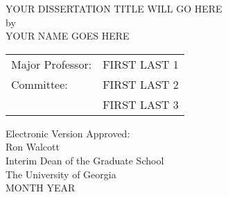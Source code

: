 \documentclass[12pt, notitlepage, twoside]{report}
\begin{document}
\newcommand{\doctitle}{Your Dissertation Title Will Go Here}
\newcommand{\docauthor}{Your Name Goes Here}



%



\newcommand{\degreesearned}{%
B.S., University of Georgia, 2018\\
  Enter only degrees already completed. Follow example above\\
  If degree was obtained outside of the US, the country \\
  of the school and date obtained will need to be provided.
}%

\newcommand{\degreetype}{[Dissertation or Thesis]}
\newcommand{\degreetitle}{[Doctor or Master]}
\newcommand{\degreename}{[Degree Name]}
\newcommand{\degreeyear}{YYYY}
\maketitlepage





\newpage
\thispagestyle{empty}
\vspace*{18pt}
\begin{center}
  \MakeUppercase{\doctitle}\\[36pt]
  by\\[36pt]
  \MakeUppercase{\docauthor}
\end{center}
\vfill

\begin{flushright}
  \begin{tabular}{ll}
    Major Professor: & FIRST LAST 1 \\ [24pt]
    Committee: & FIRST LAST 2 \\
    & FIRST LAST 3 \\
  \end{tabular}
\end{flushright}

\vspace*{3cm}

\begin{flushleft}
  Electronic Version Approved:\\[12pt]
  Ron Walcott\\
  Interim Dean of the Graduate School\\
  The University of Georgia\\
  MONTH YEAR
\end{flushleft}
\vspace*{1.5cm}
\end{document}
